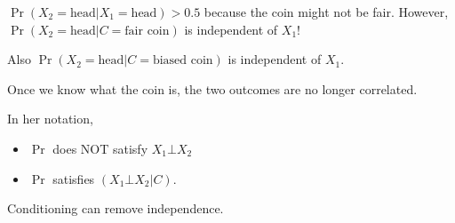 \documentclass[12pt]{article}
\begin{document}

$\Pr(X_2 = \text{head} | X_1 = \text{head}) > 0.5$ because the coin might not be fair.
However, $\Pr(X_2 = \text{head}| C = \text{fair coin})$ is independent of $X_1$!

Also $\Pr(X_2 = \text{head}| C = \text{biased coin})$ is independent of $X_1$.

Once we know what the coin is, the two outcomes are no longer correlated.

In her notation,
\begin{itemize}
  \item $\Pr$ does NOT satisfy $X_1 \bot X_2$
  \item $\Pr$ satisfies $(X_1 \bot X_2 | C)$.
\end{itemize}
Conditioning can remove independence.












\end{document}
